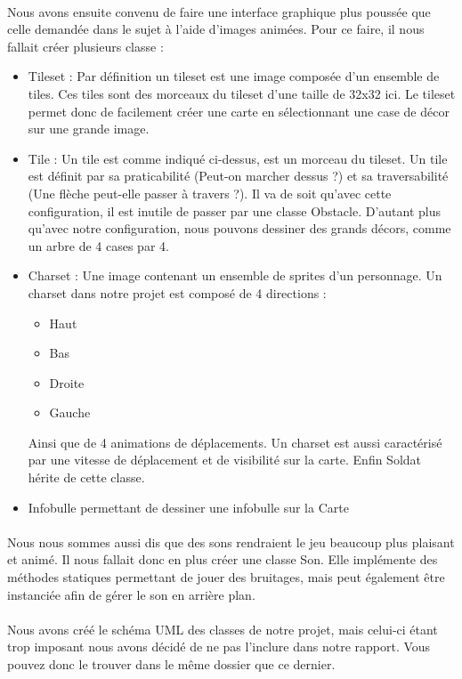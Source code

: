 \documentclass{article}
\begin{document}
\paragraph{}
Nous avons ensuite convenu de faire une interface graphique plus poussée que celle demandée dans le sujet à l'aide d'images animées.
Pour ce faire, il nous fallait créer plusieurs classe :
\begin{itemize}
 \item Tileset : Par définition un tileset est une image composée d'un ensemble de tiles. Ces tiles sont des morceaux du tileset d'une taille de 32x32 ici. Le tileset permet donc de facilement créer une carte en sélectionnant une case de décor sur une grande image.
 \item Tile : Un tile est comme indiqué ci-dessus, est un morceau du tileset. Un tile est définit par sa praticabilité (Peut-on marcher dessus ?) et sa traversabilité (Une flèche peut-elle passer à travers ?). Il va de soit qu'avec cette configuration, il est inutile de passer par une classe Obstacle. D'autant plus qu'avec notre configuration, nous pouvons dessiner des grands décors, comme un arbre de 4 cases par 4.
 \item Charset : Une image contenant un ensemble de sprites d'un personnage. Un charset dans notre projet est composé de 4 directions :
   \begin{itemize}
     \item Haut
     \item Bas
     \item Droite
     \item Gauche
   \end{itemize}
   Ainsi que de 4 animations de déplacements. Un charset est aussi caractérisé par une vitesse de déplacement et de visibilité sur la carte. Enfin Soldat hérite de cette classe.
 \item Infobulle permettant de dessiner une infobulle sur la Carte
\end{itemize}

\paragraph{}
Nous nous sommes aussi dis que des sons rendraient le jeu beaucoup plus plaisant et animé. 
Il nous fallait donc en plus créer une classe Son. 
Elle implémente des méthodes statiques permettant de jouer des bruitages, mais peut également être instanciée afin de gérer le son en arrière plan.

\paragraph{}
Nous avons créé le schéma UML des classes de notre projet, mais celui-ci étant trop imposant nous avons décidé de ne pas l'inclure dans notre rapport.
Vous pouvez donc le trouver dans le même dossier que ce dernier.
\end{document}
